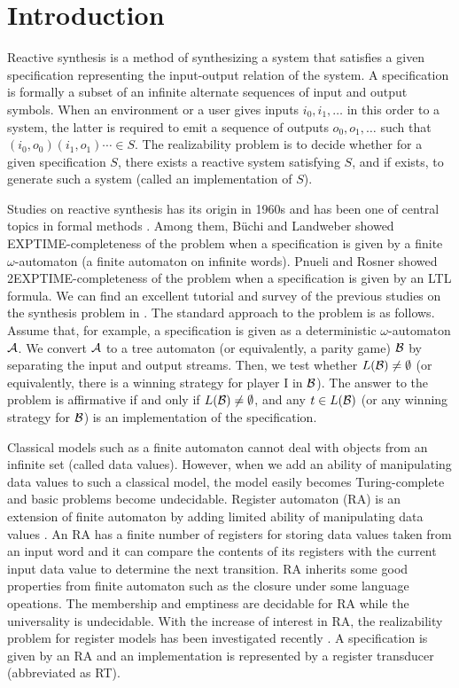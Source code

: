 \section{Introduction}
\noindent
Reactive synthesis is a method of synthesizing a system that satisfies a given specification
representing the input-output relation of the system.
A specification is formally a subset of an infinite alternate sequences of input and output symbols.
When an environment or a user gives inputs $i_0, i_1, \ldots$ in this order
to a system, the latter is required to emit a sequence
of outputs $o_0, o_1, \ldots$ such that $(i_0, o_0)(i_1, o_1)\cdots \in S$.
The realizability problem is to decide whether for a given specification $S$,
there exists a reactive system satisfying $S$, and if exists, to generate such a system
(called an implementation of $S$).

Studies on reactive synthesis has its origin in 1960s and has been one of central topics
in formal methods \cite{CGP01}.
Among them, B\"{u}chi and Landweber \cite{BL69} showed EXPTIME-completeness of the problem
when a specification is given by a finite $\omega$-automaton (a finite automaton on infinite words).
Pnueli and Rosner \cite{PR89} showed 2EXPTIME-completeness of the problem
when a specification is given by an LTL formula.
We can find an excellent tutorial and survey of the previous studies
on the synthesis problem in \cite{BCJ18}.
The standard approach to the problem is as follows.
Assume that, for example, a specification is given as a deterministic $\omega$-automaton ${\cal A}$.
We convert ${\cal A}$ to a tree automaton (or equivalently, a parity game) ${\cal B}$
by separating the input and output streams.
Then, we test whether $L({\cal B})\neq\emptyset$ (or equivalently, there is a winning strategy
for player I in ${\cal B}$).
The answer to the problem is affirmative if and only if $L({\cal B})\not=\emptyset$,
and any $t\in L({\cal B})$ (or any winning strategy for ${\cal B}$)
is an implementation of the specification.

Classical models such as a finite automaton cannot deal with
objects from an infinite set (called data values).
However, when we add an ability of manipulating data values to such a classical model,
the model easily becomes Turing-complete and basic problems become undecidable.
Register automaton (RA) is an extension of finite automaton by adding limited ability of
manipulating data values \cite{KF94,NSV04,Se06}.
An RA has a finite number of registers for storing data values taken from an input word and
it can compare the contents of its registers with the current input data value
to determine the next transition.
RA inherits some good properties from finite automaton such as the closure under some
language opeations.
The membership and emptiness are decidable for RA while the universality is undecidable.
With the increase of interest in RA, the realizability problem for register models
has been investigated recently \cite{ESK14,KMB18,EFR19,KK19}.
A specification is given by an RA and
an implementation is represented by a register transducer (abbreviated as RT).

